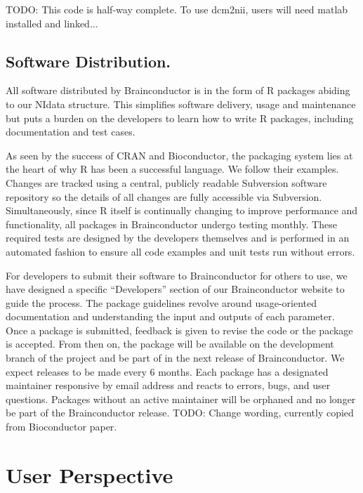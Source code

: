 \documentclass{nature}
\begin{document}
{\color{red}TODO: This code is half-way complete. To use dcm2nii, users will
need
matlab installed and linked...}




\subsection{Software Distribution.}

All software distributed by Brainconductor is in the form of R packages abiding
to our NIdata structure. This
simplifies software delivery, usage and maintenance but puts a burden on the
developers
to learn how to write R packages, including documentation and test cases.

As seen by the success of CRAN and Bioconductor, the packaging system lies
at the heart of why R has been a successful language. We follow their examples.
Changes are tracked using a central, publicly readable Subversion software
repository
so the details of all changes are fully accessible via Subversion.
Simultaneously, since
R itself is continually changing to improve performance and functionality, all
packages
in Brainconductor undergo testing monthly. These required tests are designed by
the
developers themselves and is performed in an automated fashion to ensure
all code examples and unit tests run without errors.

For developers to submit their software to Brainconductor for others to use,
we have designed a specific ``Developers'' section of our Brainconductor website
to guide the process. The package guidelines revolve around usage-oriented
documentation and understanding the input and outputs of each parameter.
 Once
a package is submitted, feedback is given to revise the code or the package is
accepted.
From then on, the package will be available on the
development branch of the project and be part of in the next release of
Brainconductor.
We expect releases to be made every 6 months.
Each package has a designated maintainer responsive by email address and reacts
to
errors, bugs, and user questions. Packages without an active maintainer will be
orphaned and no longer be part of the Brainconductor release.
{\color{red}TODO: Change wording, currently copied from Bioconductor paper.}


\section{User Perspective}
\end{document}
